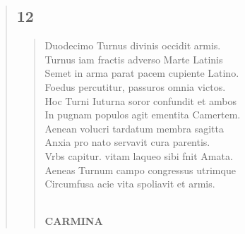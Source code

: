 \documentclass[11pt, a4paper]{report}
\begin{document}
\begin{verse}
  \subsection*{12}
      \begin{verse}
      Duodecimo Turnus divinis occidit armis. \\ Turnus iam fractis adverso Marte Latinis \\ Semet in arma parat pacem cupiente Latino. \\ Foedus percutitur, passuros omnia victos. \\ Hoc Turni Iuturna soror confundit et ambos \\ In pugnam populos agit ementita Camertem. \\ Aenean volucri tardatum membra sagitta \\ Anxia pro nato servavit cura parentis. \\ Vrbs capitur. vitam laqueo sibi fnit Amata. \\ Aeneas Turnum campo congressus utrimque \\ Circumfusa acie vita spoliavit et armis. \\ 
        ﻿\pagebreak 
    \begin{center} \textbf{CARMINA} \end{center} \marginpar{[16]} 
      \end{verse}
  
      \end{verse}
  
\end{document}
